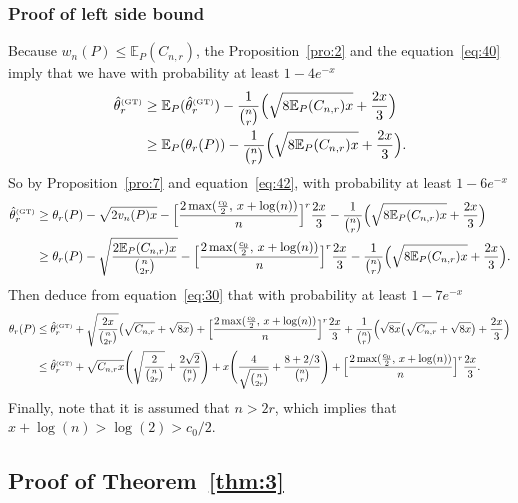 \documentclass{article}
\newcommand{\1}{\boldsymbol{1}}
\newcommand{\EE}{\mathbb{E}}
\theoremstyle{plain}
\begin{document}
\subsubsection{Proof of left side bound}


Because $w_n(P) \leq \EE_P(C_{n,r})$, the Proposition~\ref{pro:2} and the equation~\eqref{eq:40} imply that we have with probability at least $1 - 4e^{-x}$
\begin{align*}
  \hat{\theta}_r^{\text{\tiny{(GT)}}}%
  &\geq \EE_P(\hat{\theta}_r^{\text{\tiny{(GT)}}}) - \frac{1}{\binom{n}{r}}\Big(\sqrt{8\EE_P(C_{n,r})x} + \frac{2x}{3}\Big)\\
  &\geq \EE_P(\theta_r(P)) - \frac{1}{\binom{n}{r}}\Big(\sqrt{8\EE_P(C_{n,r})x} + \frac{2x}{3}\Big).
\end{align*}
So by Proposition~\ref{pro:7} and equation~\eqref{eq:42}, with probability at least $1 - 6e^{-x}$
\begin{align*}
  \hat{\theta}_r^{\text{\tiny{(GT)}}}%
  &\geq \theta_r(P) - \sqrt{2v_n(P)x} - \Big[\frac{2\max(\frac{c_0}{2},\,x+\log(n))}{n}\Big]^r \frac{2x}{3} - \frac{1}{\binom{n}{r}}\Big(\sqrt{8\EE_P(C_{n,r})x} + \frac{2x}{3}\Big)\\
  &\geq \theta_r(P) - \sqrt{\frac{2 \EE_P(C_{n,r}) x}{\binom{n}{2r}}} -
   \Big[\frac{2\max(\frac{c_0}{2},\,x+\log(n))}{n}\Big]^r \frac{2x}{3} - \frac{1}{\binom{n}{r}}\Big(\sqrt{8\EE_P(C_{n,r})x} + \frac{2x}{3}\Big).
\end{align*}
  Then deduce from equation~\eqref{eq:30} that with probability at least $1 - 7e^{-x}$
\begin{align*}
  \theta_r(P)%
  &\leq \hat{\theta}_r^{\text{\tiny{(GT)}}}%
    + \sqrt{\frac{2x}{\binom{n}{2r}}}\big(\sqrt{C_{n,r}} + \sqrt{8x} \big) + \Big[\frac{2\max(\frac{c_0}{2},\,x+\log(n))}{n}\Big]^r \frac{2x}{3}
    + \frac{1}{\binom{n}{r}}\Big(\sqrt{8x}\big(\sqrt{C_{n,r}} + \sqrt{8x} \big) + \frac{2x}{3}\Big)\\
  &\leq \hat{\theta}_r^{\text{\tiny{(GT)}}}%
    + \sqrt{C_{n,r}x}\Bigg(\sqrt{\frac{2}{\binom{n}{2r}}} + \frac{2\sqrt{2}}{\binom{n}{r}} \Bigg)%
    + x\Bigg(\frac{4}{\sqrt{\binom{n}{2r}}} + \frac{8 + 2/3}{\binom{n}{r}} \Bigg)%
    + \Big[\frac{2\max(\frac{c_0}{2},\,x+\log(n))}{n}\Big]^r \frac{2x}{3}.
\end{align*}
Finally, note that it is assumed that $n > 2r$, which implies that $x + \log(n) > \log(2) > c_0/2$.


\subsection{Proof of Theorem~\ref{thm:3}}
\label{sec:proof-theor-refthm:3}
\end{document}

